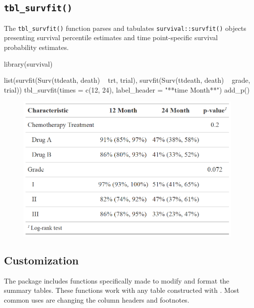 \subsection{\texorpdfstring{\texttt{tbl\_survfit()}}{tbl\_survfit()}}

The \texttt{tbl\_survfit()} function parses and tabulates \texttt{survival::survfit()} objects presenting survival percentile estimates and time point-specific survival probability estimates. 

\begin{example}
library(survival)

list(survfit(Surv(ttdeath, death) ~ trt, trial),
     survfit(Surv(ttdeath, death) ~ grade, trial)) %
  tbl_survfit(times = c(12, 24),
              label_header = "**{time} Month**") %
  add_p()
\end{example}

\begin{figure}[h!]
  \includegraphics[scale=0.28]{survfit.png}
  \centering
\end{figure}

\subsection{Customization}

The  package includes functions specifically made to modify and format the summary tables.
These functions work with any table constructed with .
Most common uses are changing the column headers and footnotes.



